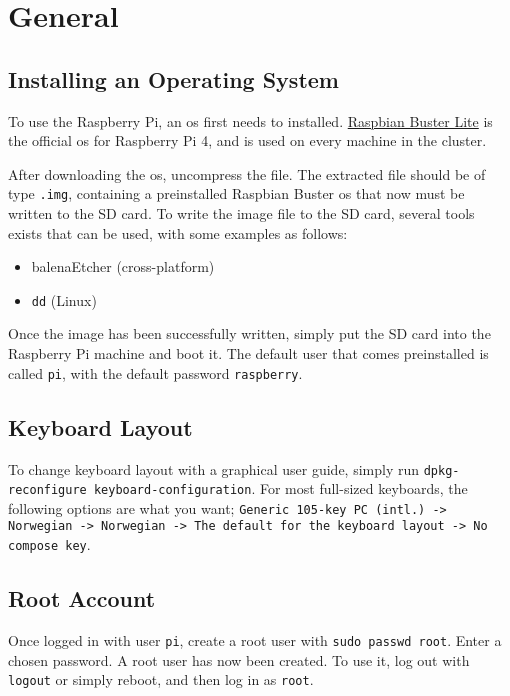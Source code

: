 \chapter{General}

\section{Installing an Operating System} \label{install_os}

To use the Raspberry Pi, an \gls{os} first needs to installed. \href{https://www.raspberrypi.org/downloads/raspbian/}{Raspbian Buster Lite} is the official \gls{os} for Raspberry Pi 4, and is used on every machine in the cluster.


After downloading the \gls{os}, uncompress the file. The extracted file should be of type \lstinline{.img}, containing a preinstalled Raspbian Buster \gls{os} that now must be written to the SD card. To write the image file to the SD card, several tools exists that can be used, with some examples as follows:

\begin{itemize}
    \item balenaEtcher (cross-platform)
    \item \lstinline{dd} (Linux)
\end{itemize}

Once the image has been successfully written, simply put the SD card into the Raspberry Pi machine and boot it. The default user that comes preinstalled is called \lstinline{pi}, with the default password \lstinline{raspberry}.


\section{Keyboard Layout} \label{keyboard_layout}

To change keyboard layout with a graphical user guide, simply run \lstinline{dpkg-reconfigure keyboard-configuration}. For most full-sized keyboards, the following options are what you want; \lstinline{Generic 105-key PC (intl.) -> Norwegian -> Norwegian -> The default for the keyboard layout -> No compose key}.


\section{Root Account} \label{root_account}

Once logged in with user \lstinline{pi}, create a root user with \lstinline{sudo passwd root}. Enter a chosen password. A root user has now been created. To use it, log out with \lstinline{logout} or simply reboot, and then log in as \lstinline{root}.

